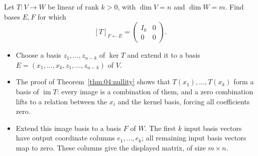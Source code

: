 \begin{problem}\label{ex:04:canonical-map}
Let \(T:V\to W\) be linear of rank \(k>0\), with \(\dim V=n\) and \(\dim W=m\).
Find bases \(E,F\) for which
\[
[T]_{F\leftarrow E}=\begin{pmatrix}I_k&0\\0&0\end{pmatrix}.
\]
\end{problem}
\begin{solution}
\begin{itemize}
\item Choose a basis \(z_1,\ldots,z_{n-k}\) of \(\ker T\) and extend it to a
basis \(E=(x_1,\ldots,x_k,z_1,\ldots,z_{n-k})\) of \(V\).
\item The proof of Theorem~\ref{thm:04:nullity} shows that \(T(x_1),\ldots,T(x_k)\)
form a basis of \(\operatorname{im}T\):
every image is a combination of them, and a zero combination lifts to a
relation between the \(x_i\) and the kernel basis, forcing all coefficients zero.
\item Extend this image basis to a basis \(F\) of \(W\).
The first \(k\) input basis vectors have output coordinate columns
\(e_1,\ldots,e_k\); all remaining input basis vectors map to zero.
These columns give the displayed matrix, of size \(m\times n\).
\end{itemize}
\end{solution}

